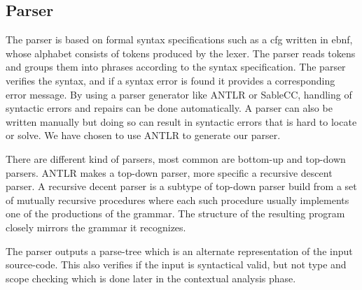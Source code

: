 \subsection*{Parser}
The parser is based on formal syntax specifications such as a \acrfull{cfg} written in \acrfull{ebnf}, whose alphabet consists of tokens produced by the lexer. 
The parser reads tokens and groups them into phrases according to the syntax specification.
The parser verifies the syntax, and if a syntax error is found it provides a corresponding error message. \citep{Crafting_book}
By using a parser generator like ANTLR or SableCC, handling of syntactic errors and repairs can be done automatically.
A parser can also be written manually but doing so can result in syntactic errors that is hard to locate or solve.
We have chosen to use ANTLR to generate our parser.

There are different kind of parsers, most common are bottom-up and top-down parsers.
ANTLR makes a top-down parser, more specific a recursive descent parser.
A recursive decent parser is a subtype of top-down parser build from a set of mutually recursive procedures where each such procedure usually implements one of the productions of the grammar.
The structure of the resulting program closely mirrors the grammar it recognizes. \citep{Recursive_programming}

The parser outputs a parse-tree which is an alternate representation of the input source-code. 
This also verifies if the input is syntactical valid, but not type and scope checking which is done later in the contextual analysis phase. 


